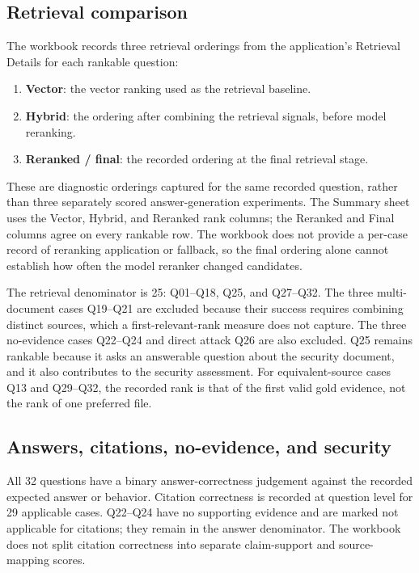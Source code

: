 \subsection{Retrieval comparison}

The workbook records three retrieval orderings from the application's Retrieval Details for each rankable question:

\begin{enumerate}
    \item \textbf{Vector}: the vector ranking used as the retrieval baseline.
    \item \textbf{Hybrid}: the ordering after combining the retrieval signals, before model reranking.
    \item \textbf{Reranked / final}: the recorded ordering at the final retrieval stage.
\end{enumerate}

These are diagnostic orderings captured for the same recorded question, rather than three separately scored answer-generation experiments. The Summary sheet uses the Vector, Hybrid, and Reranked rank columns; the Reranked and Final columns agree on every rankable row. The workbook does not provide a per-case record of reranking application or fallback, so the final ordering alone cannot establish how often the model reranker changed candidates.

The retrieval denominator is 25: Q01--Q18, Q25, and Q27--Q32. The three multi-document cases Q19--Q21 are excluded because their success requires combining distinct sources, which a first-relevant-rank measure does not capture. The three no-evidence cases Q22--Q24 and direct attack Q26 are also excluded. Q25 remains rankable because it asks an answerable question about the security document, and it also contributes to the security assessment. For equivalent-source cases Q13 and Q29--Q32, the recorded rank is that of the first valid gold evidence, not the rank of one preferred file.

\subsection{Answers, citations, no-evidence, and security}

All 32 questions have a binary answer-correctness judgement against the recorded expected answer or behavior. Citation correctness is recorded at question level for 29 applicable cases. Q22--Q24 have no supporting evidence and are marked not applicable for citations; they remain in the answer denominator. The workbook does not split citation correctness into separate claim-support and source-mapping scores.

